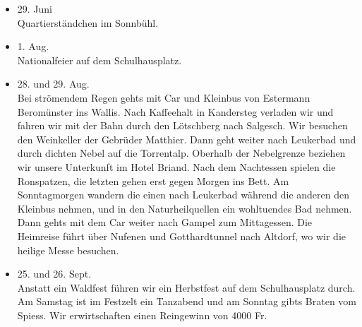\begin{history}
\begin{itemize}
        \item[]29. Juni\\
        Quartierständchen im Sonnbühl.

        \item[]1. Aug.\\
        Nationalfeier auf dem Schulhausplatz.

        \item[]28. und 29. Aug.\\
        Bei strömendem Regen gehts mit Car und Kleinbus von Estermann
        Beromünster ins Wallis. Nach Kaffeehalt in Kandersteg verladen wir und
        fahren wir mit der Bahn durch den Lötschberg nach Salgesch. Wir besuchen
        den Weinkeller der Gebrüder Matthier. Dann geht weiter nach Leukerbad
        und durch dichten Nebel auf die Torrentalp. Oberhalb der Nebelgrenze
        beziehen wir unsere Unterkunft im Hotel Briand. Nach dem Nachtessen
        spielen die Ronspatzen, die letzten gehen erst gegen Morgen ins Bett. Am
        Sonntagmorgen wandern die einen nach Leukerbad während die anderen den
        Kleinbus nehmen, und in den Naturheilquellen ein wohltuendes Bad nehmen.
        Dann gehts mit dem Car weiter nach Gampel zum Mittagessen. Die Heimreise
        führt über Nufenen und Gotthardtunnel nach Altdorf, wo wir die heilige
        Messe besuchen.

        \item[]25. und 26. Sept.\\
        Anstatt ein Waldfest führen wir ein Herbstfest auf dem Schulhausplatz
        durch. Am Samstag ist im Festzelt ein Tanzabend und am Sonntag gibts
        Braten vom Spiess. Wir erwirtschaften einen Reingewinn von 4000 Fr.

    \end{itemize}

\end{history}
